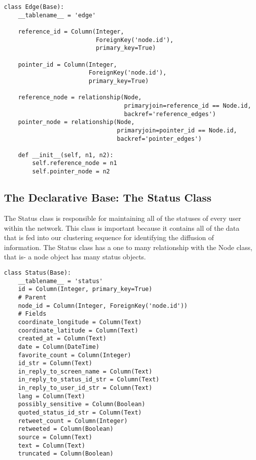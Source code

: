 \begin{lstlisting}
class Edge(Base):
    __tablename__ = 'edge'

    reference_id = Column(Integer,
                          ForeignKey('node.id'),
                          primary_key=True)

    pointer_id = Column(Integer,
                        ForeignKey('node.id'),
                        primary_key=True)

    reference_node = relationship(Node,
                                  primaryjoin=reference_id == Node.id,
                                  backref='reference_edges')
    pointer_node = relationship(Node,
                                primaryjoin=pointer_id == Node.id,
                                backref='pointer_edges')

    def __init__(self, n1, n2):
        self.reference_node = n1
        self.pointer_node = n2
\end{lstlisting}

\subsection{The Declarative Base: The  Status Class}
The Status class is responsible for maintaining all of the statuses of every user within the network. This class is important because it contains all of the data that is fed into our clustering sequence for identifying the diffusion of information. The Status class has a one to many relationship with the Node class, that is- a node object has many status objects.

\begin{lstlisting}
class Status(Base):
    __tablename__ = 'status'
    id = Column(Integer, primary_key=True)
    # Parent
    node_id = Column(Integer, ForeignKey('node.id'))
    # Fields
    coordinate_longitude = Column(Text)
    coordinate_latitude = Column(Text)
    created_at = Column(Text)
    date = Column(DateTime)
    favorite_count = Column(Integer)
    id_str = Column(Text)
    in_reply_to_screen_name = Column(Text)
    in_reply_to_status_id_str = Column(Text)
    in_reply_to_user_id_str = Column(Text)
    lang = Column(Text)
    possibly_sensitive = Column(Boolean)
    quoted_status_id_str = Column(Text)
    retweet_count = Column(Integer)
    retweeted = Column(Boolean)
    source = Column(Text)
    text = Column(Text)
    truncated = Column(Boolean)
\end{lstlisting}

